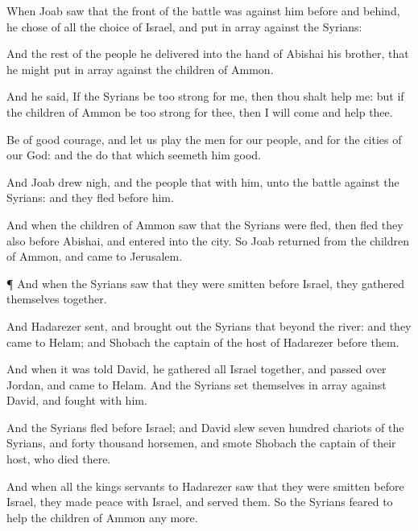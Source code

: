 {When
Joab
saw that the
front of the
battle was against him
before and
behind, he
chose of all the
choice
{} of
Israel, and put
{} in
array
against the
Syrians:

And the
rest of the
people he
delivered into the
hand of
Abishai his
brother, that he might put
{} in
array
against the
children of
Ammon.

And he
said, If the
Syrians be too
strong for me, then thou shalt
help me: but if the
children of
Ammon be too
strong for thee, then I will
come and
help thee.

Be of good
courage, and let us play the
men for our
people, and for the
cities of our
God: and the
{}
do that which
seemeth him
good.

And
Joab drew
nigh, and the
people that
{} with him, unto the
battle against the
Syrians: and they
fled
before him.

And when the
children of
Ammon
saw that the
Syrians were
fled, then
fled they also
before
Abishai, and
entered into the
city. So
Joab
returned from the
children of
Ammon, and
came to
Jerusalem.


\par }{\PP {}¶ And when the
Syrians
saw that they were
smitten
before
Israel, they
gathered themselves
together.

And
Hadarezer
sent, and brought
out the
Syrians that
{}
beyond the
river: and they
came to
Helam; and
Shobach the
captain of the
host of
Hadarezer
{}
before them.

And when it was
told
David, he
gathered all
Israel
together, and passed
over
Jordan, and
came to
Helam. And the
Syrians set themselves in
array
against
David, and
fought with him.

And the
Syrians
fled
before
Israel; and
David
slew
{}
seven
hundred
chariots of the
Syrians, and
forty
thousand
horsemen, and
smote
Shobach the
captain of their
host, who
died there.

And when all the
kings
{}
servants to
Hadarezer
saw that they were
smitten
before
Israel, they made
peace with
Israel, and
served them. So the
Syrians
feared to
help the
children of
Ammon any more.




}

